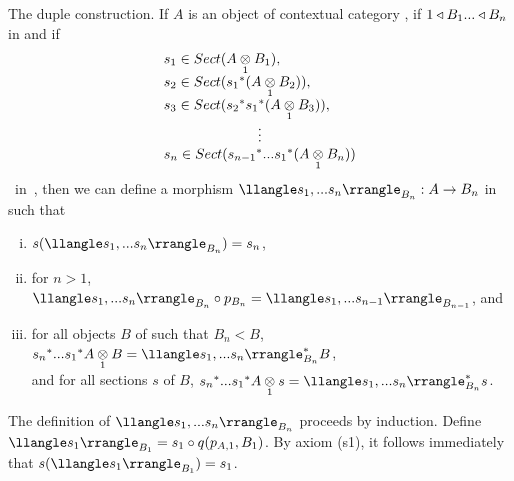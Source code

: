 \newcommand{\duplesone}{{\duple{s_1}_{B_1}}}
\newcommand{\duplestwo}{{\duple{s_1,s_2}_{B_2}}}
\newcommand{\duplesn}{\duple{s_1,...s_n}_{B_n}}
\newcommand{\duplesi}{{\duple{s_1,...s_i}_{B_i}}}
\newcommand{\duplesilessone}{\duple{s_1,...s_{i-1}}_{B_{i-1}}}
\newcommand{\duplesj}{{\duple{s_1,...s_j}_{B_j}}}
\newcommand{\duplesjlessone}{\duple{s_1,...s_{j-1}}_{B_{j-1}}}
\newcommand{\duplesisucc}{{\duple{s_1,...s_{i+1}}_{B_{i+1}}}}
\newcommand{\duplesnlessone}{{\duple{s_1,...s_{n-1}}_{B_{n-1}}}}

\newcommand {\sonesub}{{s_1}^*}
\newcommand {\stwosub}{{s_2}^*}
\newcommand {\stwocascade}{\stwosub\sonesub}
\newcommand {\sisub}{{s_i}^*}
\newcommand {\sicascade}{\sisub...\sonesub}
\newcommand {\sisuccsub}{{s_{i+1}}^*}
\newcommand {\sisucccascade}{\sisuccsub...\sonesub}
\newcommand {\snlessonesub}{{s_{n-1}}^*}
\newcommand {\snlessonecascade}{\snlessonesub...\sonesub}
\newcommand {\snsub}{{s_n}^*}
\newcommand {\sncascade}{\snsub...\sonesub}

\note The duple construction. If $A$ is an object of contextual category \catc, if $1 \triangleleft B_1 ... \triangleleft B_n$ in \catcw and if
\begin{equation*}
\begin{array}{l}
s_1 \in Sect(\crossx{A}{B_1}{1}),                  \\
s_2 \in Sect(\sonesub (\crossx{A}{B_2}{1})),         \\
s_3 \in Sect(\stwocascade (\crossx{A}{B_3}{1})),     \\
\multicolumn{1}{c}{\vdots}                           \\
s_n \in Sect(\snlessonecascade (\crossx{A}{B_n}{1})) \\
\end{array}
\end{equation*}
\mbox{ in \catc},
then  we can define a morphism
$\duplesn:A \morph B_n$ in \catcw such that 
\begin{enumerate}[(i)]
\item $s(\duplesn) = s_n$,
\item for $n> 1$, $\duplesn \circ p_{B_n} = \duplesnlessone$, and 
\item for all objects $B$ of \catcw such that $B_n < B$, 
$\sncascade \crossx{A}{B}{1} = \duplesn ^* B$, \\
and for all sections $s$ of $B$,
$\sncascade \crossx{A}{s}{1} = \duplesn ^* s$.
\end{enumerate}

The definition of $\duplesn$ proceeds by induction. 
Define $\duplesone= s_1 \circ q(p_{A,1},B_1)$.
By axiom (s1), it follows immediately that $s(\duplesone)=s_1$.

